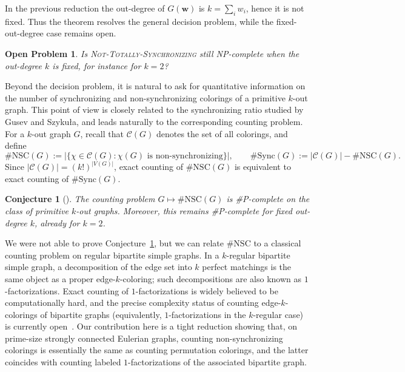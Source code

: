 \documentclass[a4paper,10pt]{amsart}
\theoremstyle{plain}
\newtheorem{conjecture}[theorem]{Conjecture}
\newtheorem{open}[theorem]{Open Problem}
\theoremstyle{definition}
\begin{document}
In the previous reduction the out-degree of $G(\mathbf w)$ is $k=\sum_i w_i$, hence it is not fixed. Thus the theorem resolves the general decision problem, while the fixed-out-degree case remains open. 
\begin{open}\label{open:nts-fixed-k}
Is \textsc{Not-Totally-Synchronizing} still NP-complete when the out-degree $k$ is fixed, for instance for $k=2$?
\end{open}
Beyond the decision problem, it is natural to ask for quantitative information on the number of synchronizing and non-synchronizing colorings of a primitive $k$-out graph. This point of view is closely related to the synchronizing ratio studied by Gusev and Szyku{\l}a, and leads naturally to the corresponding counting problem. For a $k$-out graph $G$, recall that $\mathcal C(G)$ denotes the set of all colorings, and define
\[
\#\mathrm{NSC}(G):=\bigl|\{\chi\in\mathcal C(G): \chi(G)\text{ is non-synchronizing}\}\bigr|,
\qquad
\#\mathrm{Sync}(G):=|\mathcal C(G)|-\#\mathrm{NSC}(G).
\]
Since $|\mathcal C(G)|=(k!)^{|V(G)|}$, exact counting of $\#\mathrm{NSC}(G)$ is equivalent to exact counting of $\#\mathrm{Sync}(G)$.

\begin{conjecture}[\cite{GusevCIRM2015}]\label{conj:count-nsc}
The counting problem $G\mapsto \#\mathrm{NSC}(G)$ is \#P-complete on the class of primitive $k$-out graphs. Moreover, this remains \#P-complete for fixed out-degree $k$, already for $k=2$.
\end{conjecture}
We were not able to prove Conjecture~\ref{conj:count-nsc}, but we can relate $\#\mathrm{NSC}$ to a classical counting problem on regular bipartite simple graphs. In a $k$-regular bipartite simple graph, a decomposition of the edge set into $k$ perfect matchings is the same object as a proper edge-$k$-coloring; such decompositions are also
known as $1$-factorizations. Exact counting of $1$-factorizations is widely believed to be computationally hard, and the precise complexity
status of counting edge-$k$-colorings of bipartite graphs (equivalently, $1$-factorizations in the $k$-regular case) is currently open~\cite{HongMiklos2023}. Our contribution here is a
tight reduction showing that, on prime-size strongly connected Eulerian graphs, counting non-synchronizing colorings
is essentially the same as counting permutation colorings, and the latter coincides with counting labeled
$1$-factorizations of the associated bipartite graph.
\end{document}
